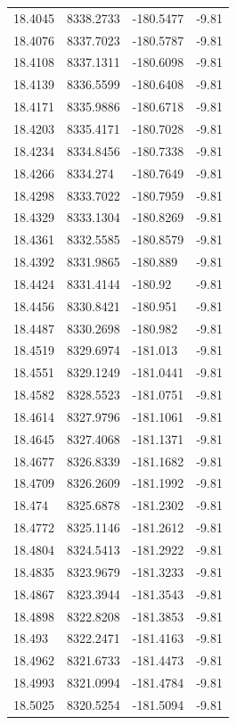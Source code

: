 \begin{table}[H]
\begin{tabular}{llll}
18.4045 & 8338.2733 & -180.5477 & -9.81 \\
18.4076 & 8337.7023 & -180.5787 & -9.81 \\
18.4108 & 8337.1311 & -180.6098 & -9.81 \\
18.4139 & 8336.5599 & -180.6408 & -9.81 \\
18.4171 & 8335.9886 & -180.6718 & -9.81 \\
18.4203 & 8335.4171 & -180.7028 & -9.81 \\
18.4234 & 8334.8456 & -180.7338 & -9.81 \\
18.4266 & 8334.274 & -180.7649 & -9.81 \\
18.4298 & 8333.7022 & -180.7959 & -9.81 \\
18.4329 & 8333.1304 & -180.8269 & -9.81 \\
18.4361 & 8332.5585 & -180.8579 & -9.81 \\
18.4392 & 8331.9865 & -180.889 & -9.81 \\
18.4424 & 8331.4144 & -180.92 & -9.81 \\
18.4456 & 8330.8421 & -180.951 & -9.81 \\
18.4487 & 8330.2698 & -180.982 & -9.81 \\
18.4519 & 8329.6974 & -181.013 & -9.81 \\
18.4551 & 8329.1249 & -181.0441 & -9.81 \\
18.4582 & 8328.5523 & -181.0751 & -9.81 \\
18.4614 & 8327.9796 & -181.1061 & -9.81 \\
18.4645 & 8327.4068 & -181.1371 & -9.81 \\
18.4677 & 8326.8339 & -181.1682 & -9.81 \\
18.4709 & 8326.2609 & -181.1992 & -9.81 \\
18.474 & 8325.6878 & -181.2302 & -9.81 \\
18.4772 & 8325.1146 & -181.2612 & -9.81 \\
18.4804 & 8324.5413 & -181.2922 & -9.81 \\
18.4835 & 8323.9679 & -181.3233 & -9.81 \\
18.4867 & 8323.3944 & -181.3543 & -9.81 \\
18.4898 & 8322.8208 & -181.3853 & -9.81 \\
18.493 & 8322.2471 & -181.4163 & -9.81 \\
18.4962 & 8321.6733 & -181.4473 & -9.81 \\
18.4993 & 8321.0994 & -181.4784 & -9.81 \\
18.5025 & 8320.5254 & -181.5094 & -9.81 \\

\end{tabular}
\end{table}

